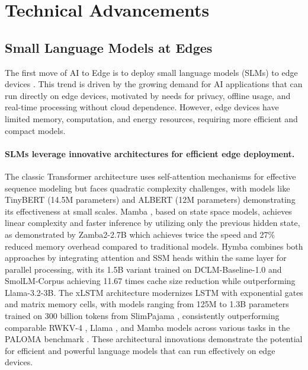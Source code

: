 \section{Technical Advancements}\label{sec:technical_advancements}



\subsection{Small Language Models at Edges}\label{subsec:small_language_models}

The first move of AI to Edge is to deploy small language models (SLMs) to edge devices \cite{lu2024small,wang2024comprehensive,van2024survey}. This trend is driven by the growing demand for AI applications that can run directly on edge devices, motivated by needs for privacy, offline usage, and real-time processing without cloud dependence. However, edge devices have limited memory, computation, and energy resources, requiring more efficient and compact models.


\paragraph{SLMs leverage innovative architectures for efficient edge deployment.}
The classic Transformer architecture \cite{vaswani2017attention} uses self-attention mechanisms for effective sequence modeling but faces quadratic complexity challenges, with models like TinyBERT \cite{jiao2020tinybert} (14.5M parameters) and ALBERT \cite{lan2020albert} (12M parameters) demonstrating its effectiveness at small scales. Mamba \cite{gu2023mamba}, based on state space models, achieves linear complexity and faster inference by utilizing only the previous hidden state, as demonstrated by Zamba2-2.7B \cite{glorioso2024zambacompact7bssm} which achieves twice the speed and 27\% reduced memory overhead compared to traditional models. Hymba \cite{dong2024hymba} combines both approaches by integrating attention and SSM heads within the same layer for parallel processing, with its 1.5B variant trained on DCLM-Baseline-1.0 and SmolLM-Corpus achieving 11.67 times cache size reduction while outperforming Llama-3.2-3B. The xLSTM architecture \cite{beck2024xlstm} modernizes LSTM with exponential gates and matrix memory cells, with models ranging from 125M to 1.3B parameters trained on 300 billion tokens from SlimPajama \cite{cerebras2023slimpajama}, consistently outperforming comparable RWKV-4 \cite{peng-etal-2023-rwkv}, Llama \cite{inan2023llama}, and Mamba models across various tasks in the PALOMA benchmark \cite{magnusson2023paloma}. These architectural innovations demonstrate the potential for efficient and powerful language models that can run effectively on edge devices.


